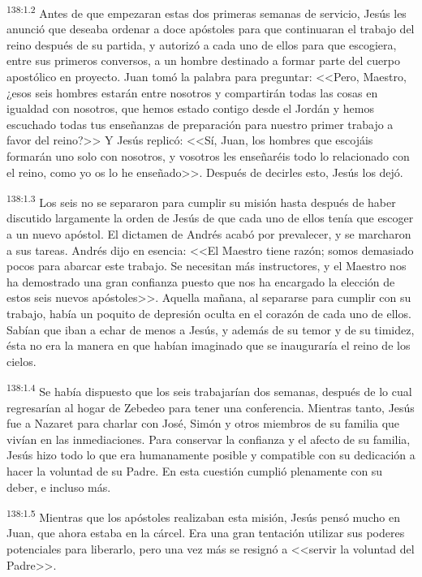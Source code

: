 \par 
\textsuperscript{138:1.2} Antes de que empezaran estas dos primeras semanas de servicio, Jesús les anunció que deseaba ordenar a doce apóstoles para que continuaran el trabajo del reino después de su partida, y autorizó a cada uno de ellos para que escogiera, entre sus primeros conversos, a un hombre destinado a formar parte del cuerpo apostólico en proyecto. Juan tomó la palabra para preguntar: <<Pero, Maestro, ¿esos seis hombres estarán entre nosotros y compartirán todas las cosas en igualdad con nosotros, que hemos estado contigo desde el Jordán y hemos escuchado todas tus enseñanzas de preparación para nuestro primer trabajo a favor del reino?>> Y Jesús replicó: <<Sí, Juan, los hombres que escojáis formarán uno solo con nosotros, y vosotros les enseñaréis todo lo relacionado con el reino, como yo os lo he enseñado>>. Después de decirles esto, Jesús los dejó.

\par 
\textsuperscript{138:1.3} Los seis no se separaron para cumplir su misión hasta después de haber discutido largamente la orden de Jesús de que cada uno de ellos tenía que escoger a un nuevo apóstol. El dictamen de Andrés acabó por prevalecer, y se marcharon a sus tareas. Andrés dijo en esencia: <<El Maestro tiene razón; somos demasiado pocos para abarcar este trabajo. Se necesitan más instructores, y el Maestro nos ha demostrado una gran confianza puesto que nos ha encargado la elección de estos seis nuevos apóstoles>>. Aquella mañana, al separarse para cumplir con su trabajo, había un poquito de depresión oculta en el corazón de cada uno de ellos. Sabían que iban a echar de menos a Jesús, y además de su temor y de su timidez, ésta no era la manera en que habían imaginado que se inauguraría el reino de los cielos.

\par 
\textsuperscript{138:1.4} Se había dispuesto que los seis trabajarían dos semanas, después de lo cual regresarían al hogar de Zebedeo para tener una conferencia. Mientras tanto, Jesús fue a Nazaret para charlar con José, Simón y otros miembros de su familia que vivían en las inmediaciones. Para conservar la confianza y el afecto de su familia, Jesús hizo todo lo que era humanamente posible y compatible con su dedicación a hacer la voluntad de su Padre. En esta cuestión cumplió plenamente con su deber, e incluso más.

\par 
\textsuperscript{138:1.5} Mientras que los apóstoles realizaban esta misión, Jesús pensó mucho en Juan, que ahora estaba en la cárcel. Era una gran tentación utilizar sus poderes potenciales para liberarlo, pero una vez más se resignó a <<servir la voluntad del Padre>>.

